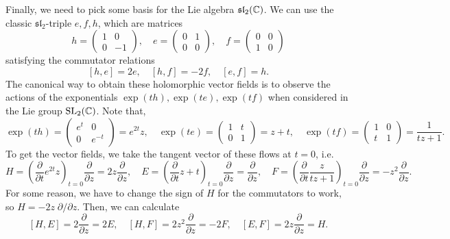 \documentclass{pset}
\begin{document}
\begin{solution}
  Finally, we need to pick some basis for the Lie algebra $\mathfrak{sl}_2(\mathbb{C})$. We can use the classic $\mathfrak{sl}_2$-triple $e,f,h$, which are matrices
  \[
    h=\begin{pmatrix}1&0\\0&-1\end{pmatrix},\quad e = \begin{pmatrix}0&1\\0&0\end{pmatrix},\quad f = \begin{pmatrix}0&0\\1&0\end{pmatrix}
  \]
  satisfying the commutator relations
  \[
    [h,e] = 2e,\quad [h,f]=-2f,\quad [e,f]=h.
  \]
  The canonical way to obtain these holomorphic vector fields is to observe the actions of the exponentials $\exp(t h), \exp(te), \exp(tf)$ when considered in the Lie group $\mathrm{SL}_2(\mathbb{C})$. Note that,
  \[\exp(th) = \begin{pmatrix}e^{t}&0\\0&e^{-t}\end{pmatrix} = e^{2t}z,\quad \exp(te)=\begin{pmatrix}1&t\\0&1\end{pmatrix} = z+t,\quad \exp(tf)=\begin{pmatrix}1&0\\t&1\end{pmatrix}=\frac{1}{tz+1}.\]
  To get the vector fields, we take the tangent vector of these flows at $t=0$, i.e.
  \[
    H = \left(\frac{\partial}{\partial t} e^{2t}z\right)_{t=0} \frac{\partial}{\partial z} = 2z\frac{\partial}{\partial z},\quad E = \left(\frac{\partial}{\partial t} z+t\right)_{t=0}\frac{\partial}{\partial z} = \frac{\partial}{\partial z},\quad F = \left(\frac{\partial}{\partial t}\frac{z}{tz+1} \right)_{t=0}\frac{\partial}{\partial z} = -z^2\frac{\partial}{\partial z}.
  \]
  For some reason, we have to change the sign of $H$ for the commutators to work, so $H=-2z\;\partial / \partial z$. Then, we can calculate
  \[
    [H, E] = 2\frac{\partial}{\partial z} = 2E, \quad [H, F] = 2z^2\frac{\partial}{\partial z} = -2F, \quad [E, F] = 2z\frac{\partial}{\partial z} = H.
  \]
\end{solution}
\end{document}
